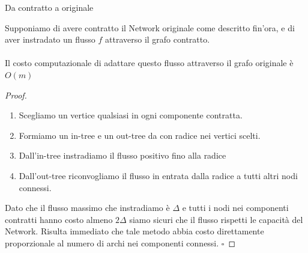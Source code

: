 \documentclass[a4paper, 11pt]{report}
\newcommand*{\QED}{\null\nobreak\hfill\ensuremath{\square}}%
\begin{document}
    \begin{lemma}[label = fixCont]{Da contratto a originale}{}
        
        Supponiamo di avere contratto il Network originale come descritto fin'ora, e di aver instradato un flusso $f$ attraverso il grafo contratto.
        \paragraph*{}
        Il costo computazionale di adattare questo flusso attraverso il grafo originale è $O(m)$
    \end{lemma}
    \begin{proof}\begin{enumerate}[nolistsep]
        \item Scegliamo un vertice qualsiasi in ogni componente contratta.
        \item Formiamo un in-tree e un out-tree da con radice nei vertici scelti. 
        \item Dall'in-tree instradiamo il flusso positivo fino alla radice 
        \item Dall'out-tree riconvogliamo il flusso in entrata dalla radice a tutti altri nodi connessi.
    \end{enumerate}
    Dato che il flusso massimo che instradiamo è $\Delta$ e tutti i nodi nei componenti contratti hanno costo almeno $2\Delta$ siamo sicuri che il flusso rispetti le capacità del Network.
    Risulta immediato che tale metodo abbia costo direttamente proporzionale al numero di archi nei componenti connessi.
    \QED
    \end{proof}
\end{document}

